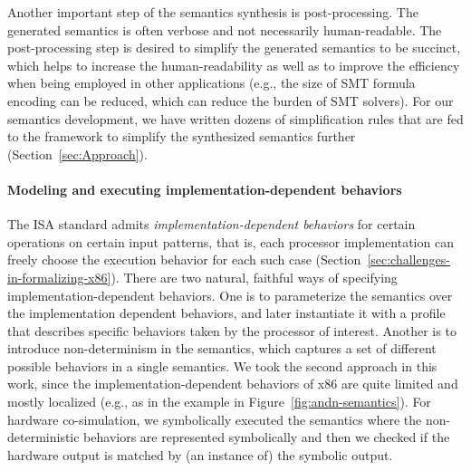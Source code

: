 %
%

Another important step of the semantics synthesis is post-processing. The generated semantics is often verbose and not necessarily human-readable. The post-processing step is desired to simplify the generated semantics to be succinct, which helps to increase the human-readability as well as to improve the efficiency when being employed in other applications (e.g., the size of SMT formula encoding can be reduced, which can reduce the burden of SMT solvers). For our semantics development, we have written dozens of simplification rules that are fed to the \K framework to simplify the synthesized semantics further (Section~\ref{sec:Approach}). 

\paragraph{Modeling and executing implementation-dependent behaviors}

The \ISA ISA standard admits \emph{implementation-dependent behaviors} for certain operations on certain input patterns, that is, each processor implementation can freely choose the execution behavior for each such case (Section~\ref{sec:challenges-in-formalizing-x86}).
There are two natural, faithful ways of specifying implementation-dependent behaviors.
One is to parameterize the semantics over the implementation dependent behaviors, and later instantiate it with a profile that describes specific behaviors taken by the processor of interest.
Another is to introduce non-determinism in the semantics, which captures a set of different possible behaviors in a single semantics.
We took the second approach in this work, since the implementation-dependent behaviors of x86 are quite limited and mostly localized (e.g., as in the example in Figure~\ref{fig:andn-semantics}).
For hardware co-simulation, we symbolically executed the semantics where the non-deterministic behaviors are represented symbolically and then we checked if the hardware output is matched by (an instance of) the symbolic output.

